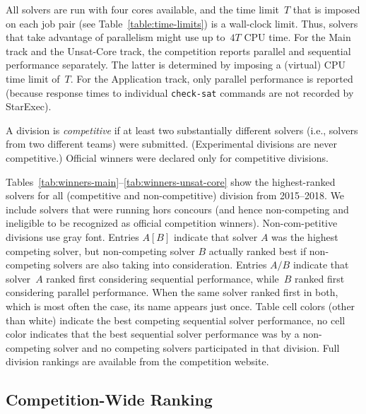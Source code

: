 \documentclass[dvipsnames,table,twoside,11pt]{article}
\begin{document}
All solvers are run with four cores available, and the time limit~$T$
that is imposed on each job pair (see Table~\ref{table:time-limits})
is a wall-clock limit.  Thus, solvers that take advantage of
parallelism might use up to~$4T$ CPU time.  For the Main track and the
Unsat-Core track, the competition reports parallel and sequential
performance separately.  The latter is determined by imposing a
(virtual) CPU time limit of~$T$.  For the Application track, only
parallel performance is reported (because response times to individual
{\tt check-sat} commands are not recorded by StarExec).

A division is \emph{competitive} if
at least two substantially different solvers (i.e., solvers from two
different teams) were submitted.  (Experimental divisions are never
competitive.)  Official winners were declared only for competitive
divisions.

Tables~\ref{tab:winners-main}--\ref{tab:winners-unsat-core} show the
highest-ranked solvers for all (competitive and non-competitive) division from
2015--2018.
We include solvers that were running hors concours (and hence non-competing
and ineligible to be recognized as official competition winners).
Non-com-petitive divisions use gray font.
Entries $A [B]$ indicate that solver $A$ was the highest competing solver,
but non-competing solver $B$ actually ranked best if non-competing solvers
are also taking into consideration.
Entries
$A/B$ indicate that solver~$A$ ranked first considering sequential
performance, while~$B$ ranked first considering parallel performance.
When the same solver ranked first in both, which is most often the
case, its name appears just once.
Table cell colors (other than white) indicate the best competing sequential
solver performance, no cell color indicates that the best sequential solver
performance was by a non-competing solver and no competing solvers participated
in that division.
Full division rankings are available from the competition website.








\subsection{Competition-Wide Ranking}
\label{sec:floc}
\end{document}

